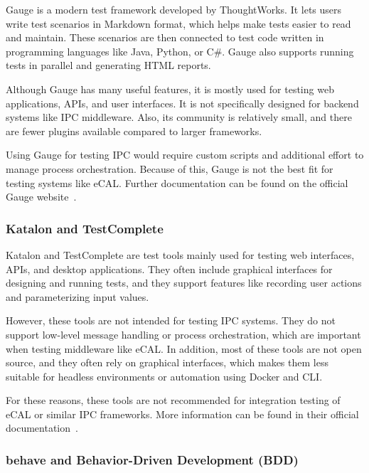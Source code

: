 Gauge is a modern test framework developed by ThoughtWorks. It lets users write test scenarios in Markdown format, which helps make tests easier to read and maintain. These scenarios are then connected to test code written in programming languages like Java, Python, or C\#. Gauge also supports running tests in parallel and generating HTML reports.

\vspace{1em}
Although Gauge has many useful features, it is mostly used for testing web applications, APIs, and user interfaces. It is not specifically designed for backend systems like IPC middleware. Also, its community is relatively small, and there are fewer plugins available compared to larger frameworks.

\vspace{1em}
Using Gauge for testing IPC would require custom scripts and additional effort to manage process orchestration. Because of this, Gauge is not the best fit for testing systems like eCAL. Further documentation can be found on the official Gauge website~\cite{GaugeDocs}.

\newpage
\subsubsection*{Katalon and TestComplete}

 Katalon and TestComplete are test tools mainly used for testing web interfaces, APIs, and desktop applications. They often include graphical interfaces for designing and running tests, and they support features like recording user actions and parameterizing input values.

\vspace{1em}
However, these tools are not intended for testing IPC systems. They do not support low-level message handling or process orchestration, which are important when testing middleware like eCAL. In addition, most of these tools are not open source, and they often rely on graphical interfaces, which makes them less suitable for headless environments or automation using Docker and CLI.

\vspace{1em}
For these reasons, these tools are not recommended for integration testing of eCAL or similar IPC frameworks. More information can be found in their official documentation~\cite{KatalonDocs,TestCompleteDocs}.

\subsubsection*{behave and Behavior-Driven Development (BDD)}

